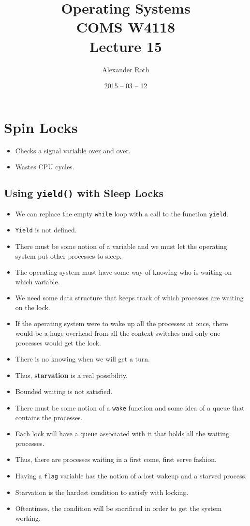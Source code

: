 \documentclass[]{article}
\begin{document}
\newcommand{\code}{\texttt}
\newtheorem{thm}{Theorem}
\title{Operating Systems \\ COMS W4118 \\ Lecture 15}
\author{Alexander Roth}
\date{2015 -- 03 -- 12}
\maketitle

\section{Spin Locks}
\begin{itemize}
\item Checks a signal variable over and over.
\item Wastes CPU cycles.
\end{itemize}

\subsection{Using \code{yield()} with Sleep Locks}
\begin{itemize}
\item We can replace the empty \code{while} loop with a call to the function
\code{yield}.
\item \code{Yield} is not defined.
\item There must be some notion of a variable and we must let the operating
system put other processes to sleep.
\item The operating system must have some way of knowing who is waiting on which
variable.
\item We need some data structure that keeps track of which processes are
waiting on the lock.
\item If the operating system were to wake up all the processes at once, there
would be a huge overhead from all the context switches and only one processes
would get the lock.
\item There is no knowing when we will get a turn.
\item Thus, \textbf{starvation} is a real possibility.
\item Bounded waiting is not satisfied.
\item There must be some notion of a \code{wake} function and some idea of a
queue that contains the processes.
\item Each lock will have a queue associated with it that holds all the waiting
processes.
\item Thus, there are processes waiting in a first come, first serve fashion.
\item Having a \code{flag} variable has the notion of a lost wakeup and a
starved process.
\item Starvation is the hardest condition to satisfy with locking.
\item Oftentimes, the condition will be sacrificed in order to get the system
working.
\end{itemize}
\end{document}
